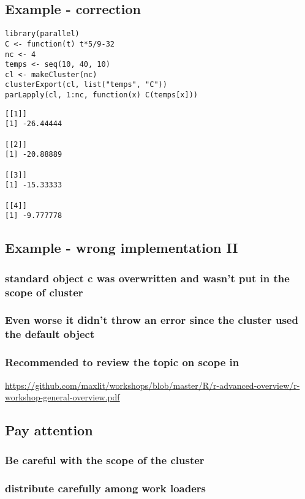 \documentclass[bigger]{beamer}
\begin{document}
\subsection{Example - correction}
\label{sec-3-10}
\begin{verbatim}
library(parallel)
C <- function(t) t*5/9-32
nc <- 4
temps <- seq(10, 40, 10)
cl <- makeCluster(nc)
clusterExport(cl, list("temps", "C"))
parLapply(cl, 1:nc, function(x) C(temps[x]))
\end{verbatim}

\begin{verbatim}
[[1]]
[1] -26.44444

[[2]]
[1] -20.88889

[[3]]
[1] -15.33333

[[4]]
[1] -9.777778
\end{verbatim}

\subsection{Example - wrong implementation II}
\label{sec-3-11}
\subsubsection{standard object \textbf{c} was overwritten and wasn't put in the scope of cluster}
\label{sec-3-11-1}
\subsubsection{Even worse it didn't throw an error since the cluster used the default object}
\label{sec-3-11-2}
\subsubsection{Recommended to review the topic on scope in}
\label{sec-3-11-3}
\url{https://github.com/maxlit/workshops/blob/master/R/r-advanced-overview/r-workshop-general-overview.pdf}
\subsection{Pay attention}
\label{sec-3-12}
\subsubsection{Be careful with the scope of the cluster}
\label{sec-3-12-1}
\subsubsection{distribute carefully among work loaders}
\label{sec-3-12-2}
\end{document}
